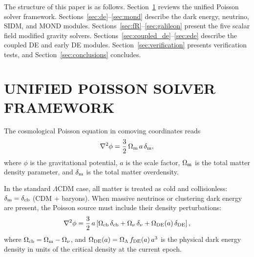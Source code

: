 \documentclass[fleqn,usenatbib]{mnras}
\newcommand{\Onu}{\Omega_\nu}
\newcommand{\Ocb}{\Omega_{\rm cb}}
\newcommand{\Om}{\Omega_{\rm m}}
\newcommand{\Ol}{\Omega_\Lambda}
\newcommand{\Ode}{\Omega_{\rm DE}}
\begin{document}
The structure of this paper is as follows.
Section~\ref{sec:poisson_framework} reviews the unified Poisson solver
framework.  Sections~\ref{sec:de}--\ref{sec:mond} describe the dark
energy, neutrino, SIDM, and MOND modules.
Sections~\ref{sec:fR}--\ref{sec:galileon} present the five scalar
field modified gravity solvers.
Sections~\ref{sec:coupled_de}--\ref{sec:ede} describe the coupled DE
and early DE modules.
Section~\ref{sec:verification} presents verification tests, and
Section~\ref{sec:conclusions} concludes.


\section{UNIFIED POISSON SOLVER FRAMEWORK}
\label{sec:poisson_framework}

The cosmological Poisson equation in comoving coordinates reads
\begin{equation}
\nabla^2 \phi = \frac{3}{2}\,\Om\,a\,\delta_{\rm m},
\label{eq:poisson_standard}
\end{equation}
where $\phi$ is the gravitational potential, $a$ is the scale factor,
$\Om$ is the total matter density parameter, and $\delta_{\rm m}$ is
the total matter overdensity.

In the standard $\Lambda$CDM case, all matter is treated as cold and
collisionless: $\delta_{\rm m} = \delta_{\rm cb}$ (CDM + baryons).
When massive neutrinos or clustering dark energy are present, the
Poisson source must include their density perturbations:
\begin{equation}
\nabla^2 \phi = \frac{3}{2}\,a\left[
  \Ocb\,\delta_{\rm cb}
  + \Onu\,\delta_\nu
  + \Ode(a)\,\delta_{\rm DE}
\right],
\label{eq:poisson_full}
\end{equation}
where $\Ocb = \Om - \Onu$, and $\Ode(a) = \Ol\,f_{\rm DE}(a)\,a^3$
is the physical dark energy density in units of the critical density
at the current epoch.
\end{document}
